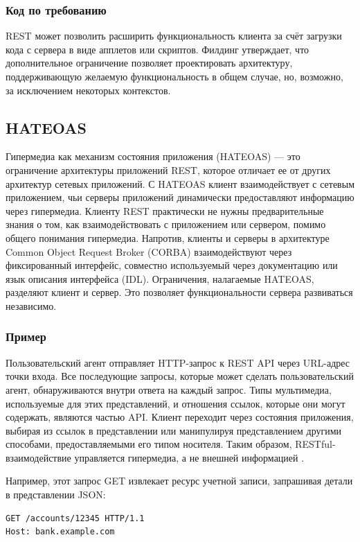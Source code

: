 \documentclass[a4page]{article}
\begin{document}
\subsubsection{Код по требованию}
REST может позволить расширить функциональность клиента за счёт загрузки кода с сервера
в виде апплетов или скриптов. Филдинг утверждает,
что дополнительное ограничение позволяет проектировать архитектуру,
поддерживающую желаемую функциональность в общем случае, но, возможно, за исключением некоторых контекстов.

\subsection{HATEOAS}\label{hateoas}
Гипермедиа как механизм состояния приложения (HATEOAS) --- это ограничение архитектуры приложений REST,
которое отличает ее от других архитектур сетевых приложений.
С HATEOAS клиент взаимодействует с сетевым приложением,
чьи серверы приложений динамически предоставляют информацию через гипермедиа.
Клиенту REST практически не нужны предварительные знания о том,
как взаимодействовать с приложением или сервером, помимо общего понимания гипермедиа.
Напротив, клиенты и серверы в архитектуре Common Object Request Broker (CORBA)
взаимодействуют через фиксированный интерфейс,
совместно используемый через документацию или язык описания интерфейса (IDL).
Ограничения, налагаемые HATEOAS, разделяют клиент и сервер.
Это позволяет функциональности сервера развиваться независимо.

\subsubsection{Пример}
Пользовательский агент отправляет HTTP-запрос к REST API через URL-адрес точки входа.
Все последующие запросы, которые может сделать пользовательский агент,
обнаруживаются внутри ответа на каждый запрос.
Типы мультимедиа, используемые для этих представлений, и отношения ссылок, которые они могут содержать,
являются частью API. Клиент переходит через состояния приложения,
выбирая из ссылок в представлении или манипулируя представлением другими способами,
предоставляемыми его типом носителя.
Таким образом, RESTful-взаимодействие управляется гипермедиа,
а не внешней информацией \cite{REST-hyper}.

Например, этот запрос GET извлекает ресурс учетной записи, запрашивая детали в представлении JSON:
\begin{lstlisting}
GET /accounts/12345 HTTP/1.1
Host: bank.example.com
\end{lstlisting}
\end{document}
